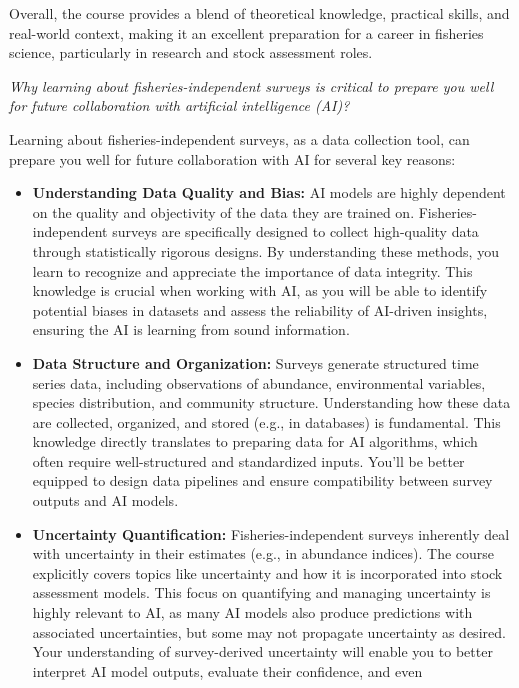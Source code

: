 \documentclass[
  letterpaper,
  oneside,
  open=any]{scrbook}
\providecommand{\tightlist}{%
  \setlength{\itemsep}{0pt}\setlength{\parskip}{0pt}}\usepackage{longtable,booktabs,array}
\begin{document}
Overall, the course provides a blend of theoretical knowledge, practical
skills, and real-world context, making it an excellent preparation for a
career in fisheries science, particularly in research and stock
assessment roles.

\emph{Why learning about fisheries-independent surveys is critical to
prepare you well for future collaboration with artificial intelligence
(AI)?}

Learning about fisheries-independent surveys, as a data collection tool,
can prepare you well for future collaboration with AI for several key
reasons:

\begin{itemize}
\tightlist
\item
  \textbf{Understanding Data Quality and Bias:} AI models are highly
  dependent on the quality and objectivity of the data they are trained
  on. Fisheries-independent surveys are specifically designed to collect
  high-quality data through statistically rigorous designs. By
  understanding these methods, you learn to recognize and appreciate the
  importance of data integrity. This knowledge is crucial when working
  with AI, as you will be able to identify potential biases in datasets
  and assess the reliability of AI-driven insights, ensuring the AI is
  learning from sound information.
\item
  \textbf{Data Structure and Organization:} Surveys generate structured
  time series data, including observations of abundance, environmental
  variables, species distribution, and community structure.
  Understanding how these data are collected, organized, and stored
  (e.g., in databases) is fundamental. This knowledge directly
  translates to preparing data for AI algorithms, which often require
  well-structured and standardized inputs. You'll be better equipped to
  design data pipelines and ensure compatibility between survey outputs
  and AI models.
\item
  \textbf{Uncertainty Quantification:} Fisheries-independent surveys
  inherently deal with uncertainty in their estimates (e.g., in
  abundance indices). The course explicitly covers topics like
  uncertainty and how it is incorporated into stock assessment models.
  This focus on quantifying and managing uncertainty is highly relevant
  to AI, as many AI models also produce predictions with associated
  uncertainties, but some may not propagate uncertainty as desired. Your
  understanding of survey-derived uncertainty will enable you to better
  interpret AI model outputs, evaluate their confidence, and even

\end{itemize}
\end{document}
